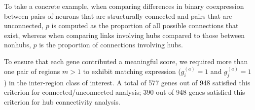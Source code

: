 \documentclass[10pt,letterpaper]{article}
\begin{document}
To take a concrete example, when comparing differences in binary coexpression between pairs of neurons that are structurally connected and pairs that are unconnected, $p$ is computed as the proportion of all possible connections that exist, whereas when comparing links involving hubs compared to those between nonhubs, $p$ is the proportion of connections involving hubs.


To ensure that each gene contributed a meaningful score, we required more than one pair of regions $m > 1$ to exhibit matching expression ($g^{(a)}_i = 1$ and $g^{(a)}_j = 1$) in the inter-region class of interest.
A total of 577 genes out of 948 satisfied this criterion for connected/unconnected analysis; 390 out of 948 genes satisfied this criterion for hub connectivity analysis.
\end{document}
